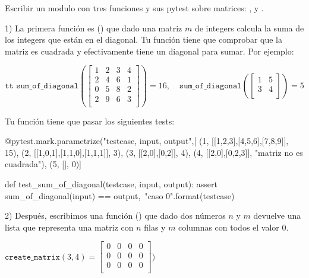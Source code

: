 \begin{ejercicio}
Escribir un modulo con tres funciones y sus pytest sobre matrices: ,  y .

1) La primera función es () que dado una matriz $m$ de integers calcula la suma de los integers que están en el diagonal. Tu función tiene que comprobar que la matriz es cuadrada y efectivamente tiene un diagonal para sumar. Por ejemplo:

$
{\texttt{tt sum\_of\_diagonal}}(
\begin{bmatrix}
    1 & 2 & 3 & 4 \\
    2 & 4 & 6 & 1 \\
    0 & 5 & 8 & 2 \\
    2 & 9 & 6 & 3 \\
\end{bmatrix})
 = 16
$, $\;\;$
$
{\texttt{sum\_of\_diagonal}}(
\begin{bmatrix}
    1 & 5   \\
    3 & 4  \\
\end{bmatrix})
 = 5
$

Tu función tiene que pasar los siguientes tests:

\begin{small}
\begin{python}
@pytest.mark.parametrize("testcase, input, output",[
(1, [[1,2,3],[4,5,6],[7,8,9]], 15),
(2, [[1,0,1],[1,1,0],[1,1,1]], 3),
(3, [[2,0],[0,2]], 4),
(4, [[2,0],[0,2,3]], "matriz no es cuadrada"),
(5, [], 0)]

def test_sum_of_diagonal(testcase, input, output):
    assert sum_of_diagonal(input) == output,\
           "caso {0}".format(testcase)
\end{python}
\end{small}

2) Después, escribimos una función () que dado dos números $n$ y $m$ devuelve una lista que representa una matriz con $n$ filas y $m$ columnas con todos el valor 0.

$
{\texttt{create\_matrix}}(3,4) = 
\begin{bmatrix}
    0 & 0 & 0 & 0 \\
    0 & 0 & 0 & 0 \\
    0 & 0 & 0 & 0 \\
\end{bmatrix})
$


\end{ejercicio}
